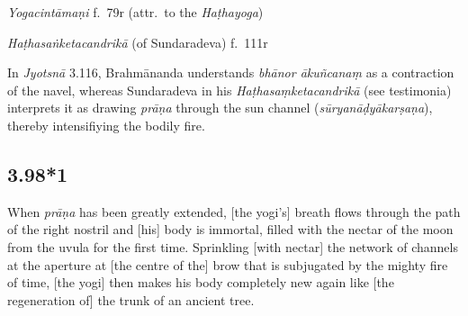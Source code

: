 \begin{ekdosis}
\begin{testimonia}[hp03_098]
\emph{Yogacintāmaṇi} f.~79r (attr.~to the \emph{Haṭhayoga})
\begin{versinnote}
\end{versinnote}

\emph{Haṭhasaṅketacandrikā} (of Sundaradeva) f.~111r
\begin{versinnote}
\end{versinnote}
\end{testimonia}

\begin{philcomm}[hp03_098]
In \emph{Jyotsnā} 3.116, Brahmānanda understands \emph{bhānor ākuñcanaṃ} as a contraction of the navel, whereas Sundaradeva in his \emph{Haṭhasaṃketacandrikā} (see testimonia) interprets it as drawing \emph{prāṇa} through the sun channel (\emph{sūryanāḍyākarṣaṇa}), thereby intensifiying the bodily fire.
\end{philcomm}


\subsection*{3.98*1}
\begin{translation}[hp03_098_1]
When \emph{prāṇa} has been greatly extended, [the yogi's] breath flows through the path of the right nostril and [his] body is immortal, filled with the nectar of the moon from the uvula for the first time. Sprinkling [with nectar] the network of channels at the aperture at [the centre of the] brow that is subjugated by the mighty fire of time, [the yogi] then makes his body completely new again like [the regeneration of] the trunk of an ancient tree.
\end{translation}


\end{ekdosis}
